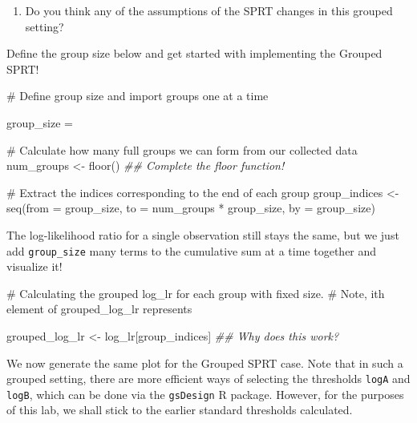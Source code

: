 \documentclass[
  letterpaper,
  DIV=11,
  numbers=noendperiod]{scrartcl}
\newenvironment{Shaded}{\begin{snugshade}}{\end{snugshade}}
\newcommand{\AttributeTok}[1]{\textcolor[rgb]{0.40,0.45,0.13}{#1}}
\newcommand{\CommentTok}[1]{\textcolor[rgb]{0.37,0.37,0.37}{#1}}
\newcommand{\DocumentationTok}[1]{\textcolor[rgb]{0.37,0.37,0.37}{\textit{#1}}}
\newcommand{\FunctionTok}[1]{\textcolor[rgb]{0.28,0.35,0.67}{#1}}
\newcommand{\NormalTok}[1]{\textcolor[rgb]{0.00,0.23,0.31}{#1}}
\newcommand{\OtherTok}[1]{\textcolor[rgb]{0.00,0.23,0.31}{#1}}
\newcommand{\SpecialCharTok}[1]{\textcolor[rgb]{0.37,0.37,0.37}{#1}}
\providecommand{\tightlist}{%
  \setlength{\itemsep}{0pt}\setlength{\parskip}{0pt}}
\begin{document}
\begin{enumerate}
\def\labelenumi{\arabic{enumi}.}
\setcounter{enumi}{12}
\tightlist
\item
  Do you think any of the assumptions of the SPRT changes in this
  grouped setting?
\end{enumerate}

\hfill\break
\hfill\break
\hfill\break
\hfill\break
\hfill\break

Define the group size below and get started with implementing the
Grouped SPRT!

\begin{Shaded}
\begin{Highlighting}[]
\CommentTok{\# Define group size and import groups one at a time}

\NormalTok{group\_size }\OtherTok{=} 
  
\CommentTok{\# Calculate how many full groups we can form from our collected data}
\NormalTok{num\_groups }\OtherTok{\textless{}{-}} \FunctionTok{floor}\NormalTok{()   }\DocumentationTok{\#\# Complete the floor function! }

\CommentTok{\# Extract the indices corresponding to the end of each group}
\NormalTok{group\_indices }\OtherTok{\textless{}{-}} \FunctionTok{seq}\NormalTok{(}\AttributeTok{from =}\NormalTok{ group\_size, }\AttributeTok{to =}\NormalTok{ num\_groups }\SpecialCharTok{*}\NormalTok{ group\_size, }\AttributeTok{by =}\NormalTok{ group\_size)}
\end{Highlighting}
\end{Shaded}

The log-likelihood ratio for a single observation still stays the same,
but we just add \texttt{group\_size} many terms to the cumulative sum at
a time together and visualize it!

\begin{Shaded}
\begin{Highlighting}[]
\CommentTok{\# Calculating the grouped log\_lr for each group with fixed size.}
\CommentTok{\# Note, ith element of grouped\_log\_lr represents }
   
\NormalTok{grouped\_log\_lr }\OtherTok{\textless{}{-}}\NormalTok{ log\_lr[group\_indices]   }\DocumentationTok{\#\# Why does this work?}
\end{Highlighting}
\end{Shaded}

We now generate the same plot for the Grouped SPRT case. Note that in
such a grouped setting, there are more efficient ways of selecting the
thresholds \texttt{logA} and \texttt{logB}, which can be done via the
\texttt{gsDesign} R package. However, for the purposes of this lab, we
shall stick to the earlier standard thresholds calculated.
\end{document}
